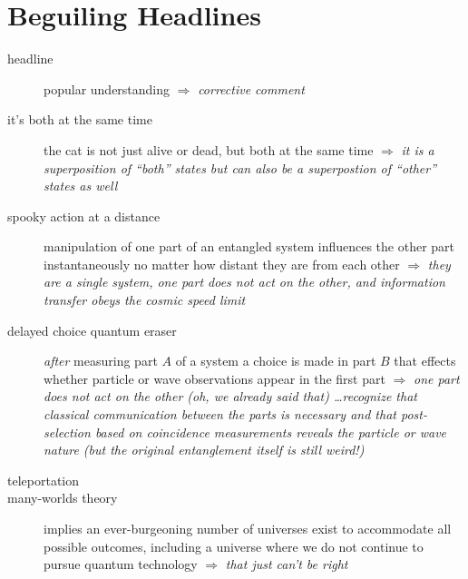 \newcommand*{\beguilerResponse}[1]{$\Rightarrow$ \emph{#1}}

\section*{Beguiling Headlines}
\begin{description}
\item[headline] popular understanding \beguilerResponse{corrective comment}
\item[it's both at the same time] the cat is not just alive or dead, but
  both at the same time \beguilerResponse{it is a
  \emph{superposition} of ``both'' states but can also be a superpostion of
``other'' states as well}
\item[spooky action at a distance] manipulation of one part of an entangled
  system influences the other part instantaneously no matter how distant
  they are from each other \beguilerResponse{they are a single system, one
    part does not \emph{act} on the other, and information transfer obeys
    the cosmic speed limit}
\item[delayed choice quantum eraser] \emph{after} measuring part $A$ of a
  system a choice is made in part $B$ that effects whether particle or wave
  observations appear in the first part \beguilerResponse{one part does not
    \emph{act} on the other (oh, we already said that) \ldots recognize
    that classical communication between the parts is necessary and that
    post-selection based on coincidence measurements reveals the particle
    or wave nature (but the original entanglement itself is still weird!)}
\item[teleportation] 
\item[many-worlds theory] implies an ever-burgeoning number of
  universes exist to accommodate all possible outcomes, including a
  universe where we do not continue to pursue quantum technology 
  \beguilerResponse{that just can't be right}
\end{description}
